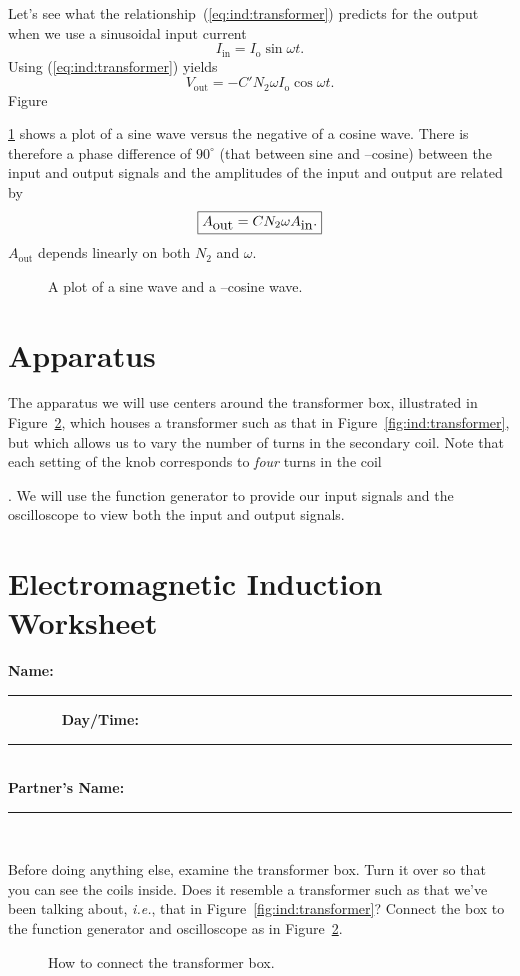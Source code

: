 Let's see what the relationship~(\ref{eq:ind:transformer}) predicts for the 
output when we use a sinusoidal input current
$$
I_{\mbox{in}} = I_{\mbox{o}} \sin\omega t.
$$
Using (\ref{eq:ind:transformer}) yields
$$
V_{\mbox{out}}= -C' N_2 \omega I_{\mbox{o}} \cos\omega t.
$$
Figure~{\ref{fig:ind:sinusoid} shows a plot of a sine wave versus the negative
of a cosine wave.
There is therefore a phase difference of $90^\circ$ (that between sine and 
--cosine) between the input and output signals and the amplitudes of the input 
and output are related by 
$$\fbox{$ \displaystyle  A_{\mbox{out}} = C N_2 \omega A_{\mbox{in}}.$} $$
$A_{\mbox{out}}$ depends linearly on both $N_2$ and $\omega$.
\begin{figure}[htb]
\centerline{\epsfxsize=10cm }
\caption{A plot of a sine wave and a --cosine wave.}
\label{fig:ind:sinusoid}
\end{figure}

\section{Apparatus}

The apparatus we will use centers around the transformer box, illustrated in
Figure~\ref{fig:ind:connect}, which houses a transformer such as that in 
Figure~\ref{fig:ind:transformer}, but which allows us to vary the number of 
turns in the secondary coil. 
Note that each setting of the knob corresponds to
{\it four} turns in the coil}. We will use the function generator to provide 
our input signals and the oscilloscope to view both the input and output 
signals.


\clearpage

\renewcommand{\thesection}{\thechapter.W}

\section{Electromagnetic Induction Worksheet}

{\bf \Large Name:}~ \rule{5cm}{.1mm}~~~~~~~
{\bf \Large Day/Time:}~\rule{3cm}{.1mm}\\
{\bf \Large Partner's Name:}~\rule{6cm}{.1mm}\\
\label{sec:ind:proc}

Before doing anything else, examine the transformer box.  Turn it over so that
you can see the coils inside.  Does it resemble a transformer such as that 
we've been talking about, {\it i.e.}, that in 
Figure~\ref{fig:ind:transformer}?  Connect the box to the function generator
and oscilloscope as in Figure~\ref{fig:ind:connect}.
\begin{figure}[htb]
\centerline{\epsfxsize=12cm }
\caption{How to connect the transformer box.}
\label{fig:ind:connect}
\end{figure}

